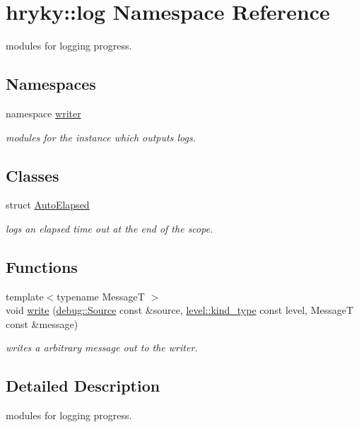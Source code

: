 \hypertarget{namespacehryky_1_1log}{\section{hryky\-:\-:log Namespace Reference}
\label{namespacehryky_1_1log}
}


modules for logging progress.  


\subsection*{Namespaces}
\begin{DoxyCompactItemize}
\item 
namespace \hyperlink{namespacehryky_1_1log_1_1writer}{writer}
\begin{DoxyCompactList}\small\item\em modules for the instance which outputs logs. \end{DoxyCompactList}\end{DoxyCompactItemize}
\subsection*{Classes}
\begin{DoxyCompactItemize}
\item 
struct \hyperlink{structhryky_1_1log_1_1_auto_elapsed}{Auto\-Elapsed}
\begin{DoxyCompactList}\small\item\em logs an elapsed time out at the end of the scope. \end{DoxyCompactList}\end{DoxyCompactItemize}
\subsection*{Functions}
\begin{DoxyCompactItemize}
\item 
\hypertarget{namespacehryky_1_1log_a5c7e76e7e42521f83c90fc8813f1f3ea}{{\footnotesize template$<$typename Message\-T $>$ }\\void \hyperlink{namespacehryky_1_1log_a5c7e76e7e42521f83c90fc8813f1f3ea}{write} (\hyperlink{classhryky_1_1debug_1_1_source}{debug\-::\-Source} const \&source, \hyperlink{classhryky_1_1_kind}{level\-::kind\-\_\-type} const level, Message\-T const \&message)}\label{namespacehryky_1_1log_a5c7e76e7e42521f83c90fc8813f1f3ea}

\begin{DoxyCompactList}\small\item\em writes a arbitrary message out to the writer. \end{DoxyCompactList}\end{DoxyCompactItemize}


\subsection{Detailed Description}
modules for logging progress. 